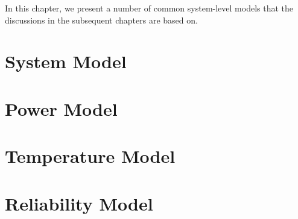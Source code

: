 In this chapter, we present a number of common system-level models that the
discussions in the subsequent chapters are based on.

\section{System Model}

\section{Power Model}

\section{Temperature Model}

\section{Reliability Model}
